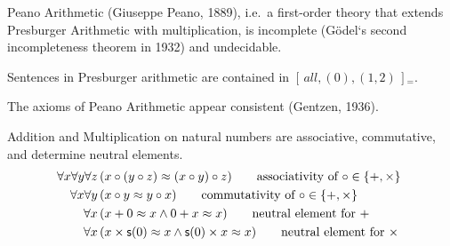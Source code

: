 \begin{theorem}Peano Arithmetic (Giuseppe Peano, 1889),
	i.e.~a first-order theory that extends Presburger Arithmetic with multiplication, is incomplete (Gödel`s second incompleteness theorem in 1932) and undecidable.
\end{theorem}

\begin{remark}
	Sentences in Presburger arithmetic are contained in
	\( [ \, all , (0), (1,2) \, ]{}_{=} \).
\end{remark}

\begin{theorem}
	The axioms of Peano Arithmetic appear consistent (Gentzen, 1936).
\end{theorem}

\begin{lemma}[ACN]\label{lem:acn}
	Addition and Multiplication on natural numbers are associative, commutative,
	and determine neutral elements.
	\begin{align*}
	\forall x\forall y\forall z\,&(x\circ(y\circ z) \mEQ (x\circ y)\circ z)
	\tag*{associativity of \( \circ\in \{ +,\times \} \) }
	\\
	\forall x\forall y\,&(x\circ y \mEQ y\circ x)
	\tag*{commutativity of \( \circ\in \{ +, \times \} \)}
	\\
	\forall x\,&(x + 0\mEQ x \land 0 + x \mEQ x )
	\tag*{neutral element for \( + \)}
	\\
	\forall x\,&(x \times \msucc(0)\mEQ x \land \msucc(0) \times x \mEQ x )
	\tag*{neutral element for \( \times \)}
	\end{align*}
\end{lemma}











